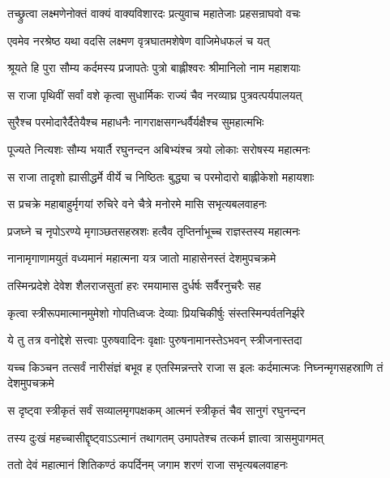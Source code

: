 
\twolineshloka
{तच्छ्रुत्वा लक्ष्मणेनोक्तं वाक्यं वाक्यविशारदः}
{प्रत्युवाच महातेजाः प्रहसन्राघवो वचः} %

\twolineshloka
{एवमेव नरश्रेष्ठ यथा वदसि लक्ष्मण}
{वृत्रघातमशेषेण वाजिमेधफलं च यत्} %

\twolineshloka
{श्रूयते हि पुरा सौम्य कर्दमस्य प्रजापतेः}
{पुत्रो बाह्लीश्वरः श्रीमानिलो नाम महाशयाः} %

\twolineshloka
{स राजा पृथिवीं सर्वां वशे कृत्वा सुधार्मिकः}
{राज्यं चैव नरव्याघ्र पुत्रवत्पर्यपालयत्} %

\twolineshloka
{सुरैश्च परमोदारैर्दैतेयैश्च महाधनैः}
{नागराक्षसगन्धर्वैर्यक्षैश्च सुमहात्मभिः} %

\twolineshloka
{पूज्यते नित्यशः सौम्य भयार्तै रघुनन्दन}
{अबिभ्यंश्च त्रयो लोकाः सरोषस्य महात्मनः} %

\twolineshloka
{स राजा तादृशो ह्यासीद्धर्मे वीर्ये च निष्ठितः}
{बुद्ध्या च परमोदारो बाह्लीकेशो महायशाः} %

\twolineshloka
{स प्रचक्रे महाबाहुर्मृगयां रुचिरे वने}
{चैत्रे मनोरमे मासि सभृत्यबलवाहनः} %

\twolineshloka
{प्रजघ्ने च नृपोऽरण्ये मृगाञ्छतसहस्रशः}
{हत्वैव तृप्तिर्नाभूच्च राज्ञस्तस्य महात्मनः} %

\twolineshloka
{नानामृगाणामयुतं वध्यमानं महात्मना}
{यत्र जातो माहासेनस्तं देशमुपचक्रमे} %

\twolineshloka
{तस्मिन्प्रदेशे देवेश शैलराजसुतां हरः}
{रमयामास दुर्धर्षः सर्वैरनुचरैः सह} %

\twolineshloka
{कृत्वा स्त्रीरूपमात्मानमुमेशो गोपतिध्वजः}
{देव्याः प्रियचिकीर्षुः संस्तस्मिन्पर्वतनिर्झरे} %

\twolineshloka
{ये तु तत्र वनोद्देशे सत्त्वाः पुरुषवादिनः}
{वृक्षाः पुरुषनामानस्तेऽभवन् स्त्रीजनास्तदा} %

\threelineshloka
{यच्च किञ्चन तत्सर्वं नारीसंज्ञं बभूव ह}
{एतस्मिन्नन्तरे राजा स इलः कर्दमात्मजः}
{निघ्नन्मृगसहस्राणि तं देशमुपचक्रमे} %

\twolineshloka
{स दृष्ट्वा स्त्रीकृतं सर्वं सव्यालमृगपक्षकम्}
{आत्मनं स्त्रीकृतं चैव सानुगं रघुनन्दन} %

\twolineshloka
{तस्य दुःखं महच्चासीद्दृष्ट्वाऽऽत्मानं तथागतम्}
{उमापतेश्च तत्कर्म ज्ञात्वा त्रासमुपागमत्} %

\twolineshloka
{ततो देवं महात्मानं शितिकण्ठं कपर्दिनम्}
{जगाम शरणं राजा सभृत्यबलवाहनः} %

